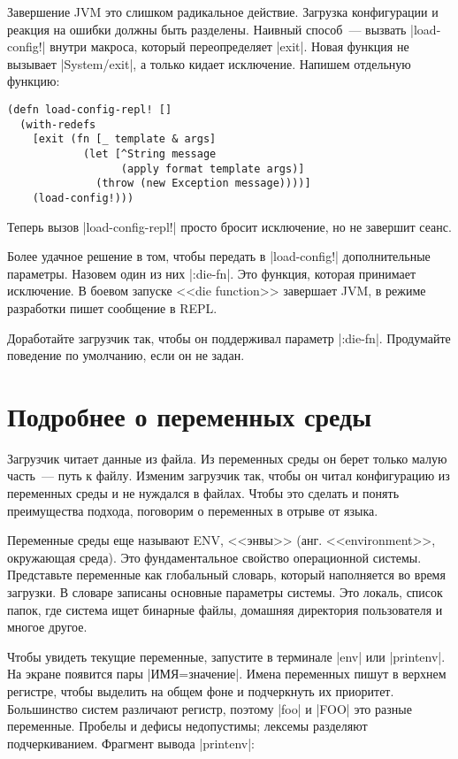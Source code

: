 Завершение JVM это слишком радикальное действие. Загрузка конфигурации и реакция
на ошибки должны быть разделены. Наивный способ~--- вызвать
\spverb|load-config!| внутри макроса, который переопределяет
\spverb|exit|. Новая функция не вызывает \spverb|System/exit|, а только кидает
исключение. Напишем отдельную функцию:

\begin{verbatim}
(defn load-config-repl! []
  (with-redefs
    [exit (fn [_ template & args]
            (let [^String message
                  (apply format template args)]
              (throw (new Exception message))))]
    (load-config!)))
\end{verbatim}

Теперь вызов \spverb|load-config-repl!| просто бросит исключение, но не завершит
сеанс.

Более удачное решение в том, чтобы передать в \spverb|load-config!|
дополнительные параметры. Назовем один из них \spverb|:die-fn|. Это функция,
которая принимает исключение. В боевом запуске <<die function>> завершает JVM, в
режиме разработки пишет сообщение в REPL.

Доработайте загрузчик так, чтобы он поддерживал параметр
\spverb|:die-fn|. Продумайте поведение по умолчанию, если он не задан.

\section{Подробнее о переменных среды}

Загрузчик читает данные из файла. Из переменных среды он берет только малую
часть~--- путь к файлу. Изменим загрузчик так, чтобы он читал конфигурацию из
переменных среды и не нуждался в файлах. Чтобы это сделать и понять преимущества
подхода, поговорим о переменных в отрыве от языка.

Переменные среды еще называют ENV, <<энвы>> (анг. <<environment>>, окружающая
среда). Это фундаментальное свойство операционной системы. Представьте
переменные как глобальный словарь, который наполняется во время загрузки. В
словаре записаны основные параметры системы. Это локаль, список папок, где
система ищет бинарные файлы, домашняя директория пользователя и многое другое.

Чтобы увидеть текущие переменные, запустите в терминале \spverb|env| или
\spverb|printenv|. На экране появится пары \spverb|ИМЯ=значение|. Имена
переменных пишут в верхнем регистре, чтобы выделить на общем фоне и подчеркнуть
их приоритет. Большинство систем различают регистр, поэтому \spverb|foo| и
\spverb|FOO| это разные переменные. Пробелы и дефисы недопустимы; лексемы
разделяют подчеркиванием. Фрагмент вывода \spverb|printenv|:

